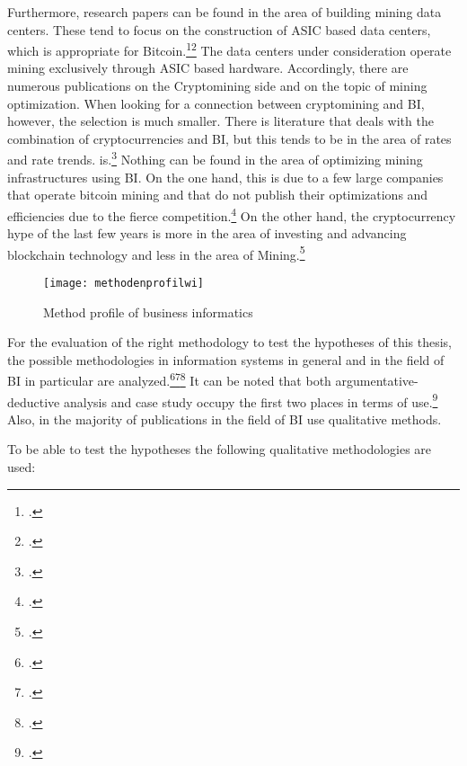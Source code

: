 \begin{enumerate}
    Furthermore, research papers can be found in the area of building mining data centers. These tend to focus on the construction of
    \ac{ASIC} based data centers, which is appropriate for Bitcoin.\footcite[Cf.][]{li2019blockchain}\footcite[Cf.][]{xie2018extreme}
    The data centers under consideration operate mining exclusively through \ac{ASIC} based hardware. Accordingly, there are numerous publications on the
    Cryptomining side and on the topic of mining optimization. When looking for a connection between
    cryptomining and \ac{BI}, however, the selection is much smaller. There is literature that deals with the combination of
    cryptocurrencies and \ac{BI}, but this tends to be in the area of rates and rate trends.
    is.\footcite[Cf.][]{botocs2017bitcoin} Nothing can be found in the area of optimizing mining infrastructures using \ac{BI}.
    On the one hand, this is due to a few large companies that operate bitcoin mining and that do not publish their optimizations and efficiencies
    due to the fierce competition.\footcite[Cf.][]{btccom2021miner} On the other hand, the cryptocurrency hype of the
    last few years is more in the area of investing and advancing blockchain technology and less in the area of
    Mining.\footcite[Cf.][]{friedlmaier2018disrupting} 
\end{enumerate}

\begin{figure}[H]
    \caption{Method profile of business informatics}
    \texttt{[image: methodenprofilwi]}
    \label{figure:methodenprofilwi}
    \\
    \cite[Source: Based on][Fig. 3]{wilde2007forschungsmethoden}
\end{figure}

For the evaluation of the right methodology to test the hypotheses of this thesis, the possible methodologies in
information systems in general and in the field of \ac{BI} in particular
are analyzed.\footcite[Cf.][]{wilde2007forschungsmethoden}\footcite[Cf.][]{wilde2006methodenspektrum}\footcite[Cf.][]{jourdan2008business} 
It can be noted that both argumentative-deductive analysis and case study occupy the first two places in terms of
use.\footcite[Cf.][Fig. 2]{wilde2007forschungsmethoden} Also, in the majority of publications in the field of
\ac{BI} use qualitative methods.

To be able to test the hypotheses the following qualitative methodologies are used:

